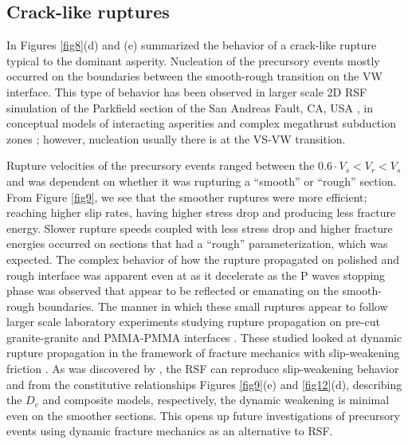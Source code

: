 \documentclass[preprint,1p, 10pt,authoryear]{elsarticle}
\begin{document}
\subsection{Crack-like ruptures}
In Figures \ref{fig8}(d) and  (e) summarized the behavior of a crack-like rupture typical to the dominant asperity. Nucleation of the precursory events mostly occurred on the boundaries between the smooth-rough transition on the VW interface. This type of behavior has been observed in larger scale 2D RSF simulation of the Parkfield section of the San Andreas Fault, CA, USA \citep{Barbot2012}, in conceptual models of interacting asperities \citep{Kato2004} and complex megathrust subduction zones \citep{Kaneko2010}; however, nucleation usually there is at the VS-VW transition. 

Rupture velocities of the precursory events ranged between the $0.6\cdot V_{s} < V_{r} < V_{s}$ and was dependent on whether it was rupturing a ``smooth'' or ``rough'' section. From Figure \ref{fig9}, we see that the smoother ruptures were more efficient; reaching higher slip rates, having higher stress drop and producing less fracture energy. Slower rupture speeds coupled with less stress drop and higher fracture energies occurred on sections that had a ``rough'' parameterization, which was expected.  The complex behavior of how the rupture propagated on polished and rough interface was apparent even at as it decelerate as the P waves stopping phase was observed \citep{Madariaga1976} that appear to be reflected or emanating on the smooth-rough boundaries. The manner in which these small ruptures appear to follow larger scale laboratory experiments studying rupture propagation on pre-cut granite-granite \citep{Passelegue2013} and PMMA-PMMA interfaces \citep{Rubinstein2004,Rubinstein2006,Ben-David2010,Fineberg2015}. These studied looked at dynamic rupture propagation in the framework of fracture mechanics with slip-weakening friction \citep{Ida1972,Andrews1976,Kammer2012,Kammer2015}.  As was discovered by \citet{Cocco2002}, the RSF can reproduce slip-weakening behavior and from the constitutive relationships Figures \ref{fig9}(e) and \ref{fig12}(d), describing the $D_{c}$  and composite models, respectively, the dynamic weakening is minimal even on the smoother sections.  This opens up future investigations of precursory events using dynamic fracture mechanics as an alternative to RSF.
\end{document}
